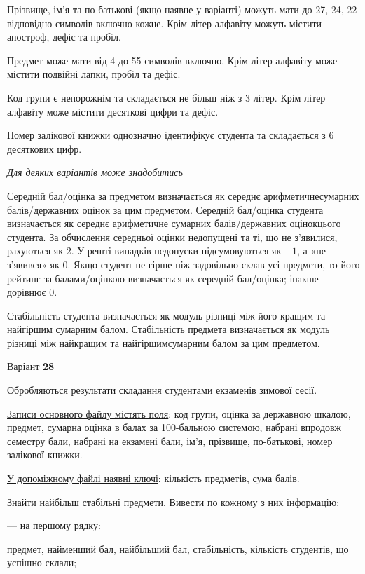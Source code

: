 \documentclass[11pt, ukrainian]{article}
\begin{document}
Прізвище, ім’я та по-батькові (якщо наявне у варіанті) можуть мати до 27, 24, 22 відповідно символів включно кожне. 
Крім літер алфавіту можуть містити апостроф, дефіс та пробіл.

Предмет може мати від 4 до 55 символів включно. 
Крім літер алфавіту може містити подвійні лапки, пробіл та дефіс.

Код групи є непорожнім та складається не більш ніж з 3 літер. 
Крім літер алфавіту може містити десяткові цифри та дефіс.


Номер залікової книжки однозначно ідентифікує студента та складається з 6 десяткових цифр. 

\bigskip\textit{Для деяких варіантів може знадобитись}

Середній бал/оцінка за предметом визначається як середнє арифметичнесумарних балів/державних оцінок за цим предметом. 
Середній бал/оцінка студента визначається як середнє арифметичне сумарних балів/державних оцінокцього студента. 
За обчислення середньої оцінки недопущені та ті, що не з’явилися, рахуються як 2.
У решті випадків недопуски підсумовуються як $-1$, а «не з’явився» як 0.
Якщо студент не гірше ніж задовільно склав усі предмети, 
то його рейтинг за балами/оцінкою визначається як середній бал/оцінка; інакше дорівнює 0.

Стабільність студента визначається як модуль різниці між його кращим та найгіршим сумарним балом.
Стабільність предмета визначається як модуль різниці між найкращим та найгіршимсумарним балом за цим предметом.






\par
\newpage
{\center Варіант  \No \textbf { 28 }\par}
\bigskip
Обробляються результати складання студентами екзаменів зимової сесії.

\underline{Записи основного файлу містять поля}: код групи, оцінка за державною шкалою, предмет, сумарна оцінка в балах за 100-бальною системою, набрані впродовж семестру бали, набрані на екзамені бали, ім’я, прізвище, по-батькові, номер залікової книжки.

\underline{У допоміжному файлі наявні ключі}: кількість предметів, сума балів.

\underline{Знайти} найбільш стабільні предмети. Вивести по кожному з них інформацію:\par
{\noindent}--- на першому рядку:\par
предмет, найменший бал, найбільший бал, стабільність, кількість студентів, що успішно склали;
\end{document}
